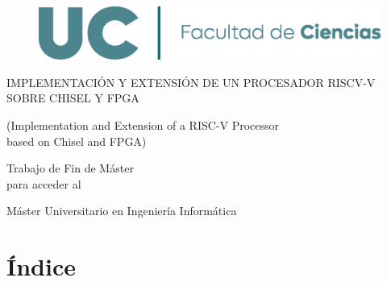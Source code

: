 \documentclass[12pt]{report}
\begin{document}
\pagestyle{fancy}
\fancyhf{}
\fancyfoot{}
\renewcommand{\headrulewidth}{0pt}
\fancyfoot[R]{\thepage}

\begin{titlepage}
\begin{figure}
    \centering
    \includegraphics[width=0.75\linewidth]{res/logo-facultad.png}
    \label{fig:logo-uc}
\end{figure}

\vspace*{140px}

\begin{center}
\Large{IMPLEMENTACIÓN Y EXTENSIÓN DE UN PROCESADOR RISCV-V SOBRE CHISEL Y FPGA}

\vspace{15px}

\large{(Implementation and Extension of a RISC-V Processor \\
based on Chisel and FPGA)}

\vspace{30px}

\normalsize{Trabajo de Fin de Máster\\para acceder al}

\vspace{15px}

\large{Máster Universitario en Ingeniería Informática}
\end{center}

\vspace{\fill}

\end{titlepage}


\chapter*{Índice}


\newpage
\end{document}
